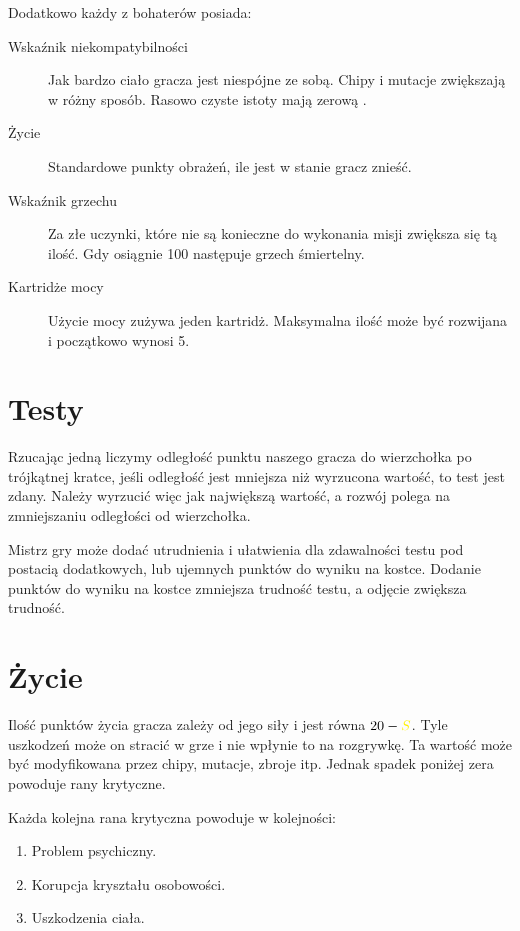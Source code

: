 Dodatkowo każdy z bohaterów posiada:
\begin{description}
 \item [Wskaźnik niekompatybilności \abnkp{}] Jak bardzo ciało gracza jest niespójne ze sobą. Chipy i mutacje zwiększają \abnkp{} w różny sposób. Rasowo czyste istoty mają zerową \abnkp{}.
 \item [Życie \abzyc{}] Standardowe punkty obrażeń, ile jest w stanie gracz znieść.
 \item [Wskaźnik grzechu \abgrz{}] Za złe uczynki, które nie są konieczne do wykonania misji zwiększa się tą ilość. Gdy osiągnie 100 następuje grzech śmiertelny.
 \item [Kartridże mocy \abkar{}] Użycie mocy zużywa jeden kartridż. Maksymalna ilość może być rozwijana i początkowo wynosi 5.
\end{description}

\section{Testy}
Rzucając jedną \dxx{} liczymy odległość punktu naszego gracza do wierzchołka po trójkątnej kratce, jeśli odległość jest mniejsza niż wyrzucona wartość, to test jest zdany.
Należy wyrzucić więc jak największą wartość, a rozwój polega na zmniejszaniu odległości od wierzchołka.

Mistrz gry może dodać utrudnienia i ułatwienia dla zdawalności testu pod postacią dodatkowych, lub ujemnych punktów do wyniku na kostce.
Dodanie punktów do wyniku na kostce zmniejsza trudność testu, a odjęcie zwiększa trudność.

\section{Życie}
Ilość punktów życia gracza zależy od jego siły i jest równa $20 - \abs$.
Tyle uszkodzeń może on stracić w grze i nie wpłynie to na rozgrywkę.
Ta wartość może być modyfikowana przez chipy, mutacje, zbroje itp.
Jednak spadek poniżej zera powoduje rany krytyczne.

Każda kolejna rana krytyczna powoduje w kolejności:
\begin{enumerate}
\item Problem psychiczny.
\item Korupcja kryształu osobowości.
\item Uszkodzenia ciała.
\end{enumerate}

